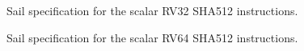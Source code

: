 \begin{figure}[h]

\caption{Sail specification for the scalar RV32 SHA512 instructions.}
\label{fig:sail:sha512:rv32}
\end{figure}

\begin{figure}[h]

\caption{Sail specification for the scalar RV64 SHA512 instructions.}
\label{fig:sail:sha512:rv64}
\end{figure}
